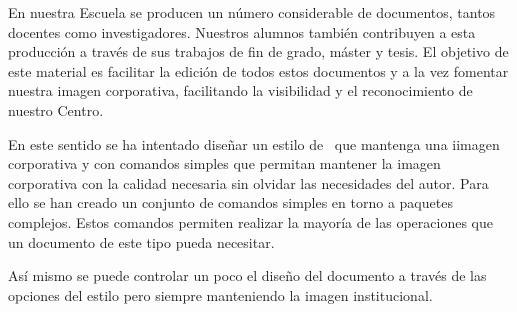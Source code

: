 En nuestra Escuela se producen un número considerable de documentos, tantos docentes
como investigadores. Nuestros alumnos también contribuyen a esta producción a
través de sus trabajos de fin de grado, máster y tesis. El objetivo de este material es facilitar
la edición de todos estos documentos y a la vez fomentar nuestra imagen corporativa,
facilitando la visibilidad y el reconocimiento de nuestro Centro.

En este sentido se ha intentado diseñar un estilo de \LaTeXe\ que mantenga una iimagen corporativa y con comandos simples que permitan mantener la imagen corporativa con la calidad necesaria sin olvidar las necesidades del autor. Para ello se han creado un conjunto de comandos simples en torno a paquetes complejos. Estos comandos permiten realizar la mayoría de las operaciones que un documento de este tipo pueda necesitar.

Así mismo se puede controlar un poco el diseño del documento a través de las opciones del estilo pero siempre manteniendo la imagen institucional. 




